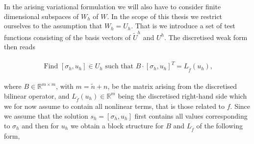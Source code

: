 \documentclass[../draft_1.tex]{subfiles}
\begin{document}
In the arising variational formulation we will also have to consider finite dimensional subspaces of $W_h$ of $W$. In the scope of this thesis we restrict ourselves to the assumption that $W_h = U_h$. That is we introduce a set of test functions consisting of the basis vectors of $\tilde{U}^h$ and $U^h$. The discretised weak form then reads 

\begin{ceqn}
	\begin{align}
	\begin{aligned}
	\text{ Find } [\sigma_h, u_h] \in U_h \text{ such that } B \cdot [\sigma_h, u_h]^T  = L_{\tilde{f}}(u_h), 
	\end{aligned}
	\end{align}
\end{ceqn}

where $B \in \mathbb{R}^{m \times m}$, with $ m = \tilde{n} + n$, be the matrix arising from the discretised bilinear operator, and $L_{\tilde{f}}(u_h) \in \mathbb{R}^m$ being the discretised right-hand side which we for now assume to contain all nonlinear terms, that is those related to $f$. Since we assume that the solution $s_h = [\sigma_h, u_h]$ first contains all values corresponding to $\sigma_h$ and then for $u_h$ we obtain a block structure for $B$ and $L_{\tilde{f}}$ of the following form,
\end{document}
